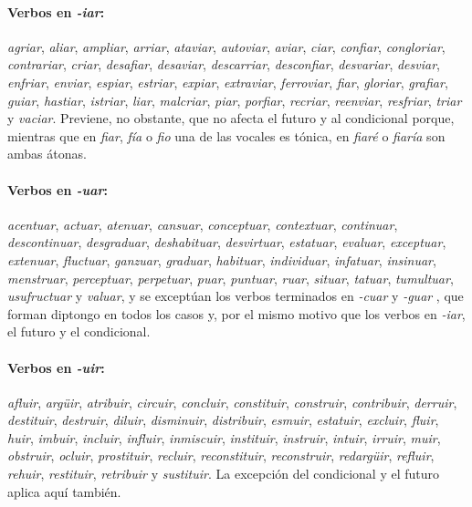 \paragraph{Verbos en \textit{-iar}:}{\textit{agriar}, \textit{aliar}, \textit{ampliar}, \textit{arriar}, \textit{ataviar}, \textit{autoviar}, \textit{aviar}, \textit{ciar}, \textit{confiar}, \textit{congloriar}, \textit{contrariar}, \textit{criar}, \textit{desafiar}, \textit{desaviar}, \textit{descarriar}, \textit{desconfiar}, \textit{desvariar}, \textit{desviar}, \textit{enfriar}, \textit{enviar}, \textit{espiar}, \textit{estriar}, \textit{expiar},  \textit{extraviar}, \textit{ferroviar}, \textit{fiar}, \textit{gloriar}, \textit{grafiar}, \textit{guiar}, \textit{hastiar}, \textit{istriar}, \textit{liar}, \textit{malcriar}, \textit{piar}, \textit{porfiar}, \textit{recriar}, \textit{reenviar}, \textit{resfriar}, \textit{triar} y \textit{vaciar}. Previene, no obstante, que no afecta el futuro y al condicional porque, mientras que en \textit{fiar}, \textit{fía} o \textit{fio} una de las vocales es tónica, en \textit{fiaré} o \textit{fiaría} son ambas átonas.}

\paragraph{Verbos en \textit{-uar}:}{\textit{acentuar}, \textit{actuar}, \textit{atenuar}, \textit{cansuar}, \textit{conceptuar}, \textit{contextuar}, \textit{continuar}, \textit{descontinuar}, \textit{desgraduar}, \textit{deshabituar}, \textit{desvirtuar}, \textit{estatuar}, \textit{evaluar}, \textit{exceptuar}, \textit{extenuar}, \textit{fluctuar}, \textit{ganzuar}, \textit{graduar}, \textit{habituar}, \textit{individuar}, \textit{infatuar}, \textit{insinuar}, \textit{menstruar}, \textit{perceptuar}, \textit{perpetuar}, \textit{puar}, \textit{puntuar}, \textit{ruar}, \textit{situar}, \textit{tatuar}, \textit{tumultuar},  \textit{usufructuar} y \textit{valuar}, y se exceptúan los verbos terminados en \textit{-cuar} \textipa{[kwaR]} y \textit{-guar} \textipa{[gwaR]}, que forman diptongo en todos los casos y, por el mismo motivo que los verbos en \textit{-iar}, el futuro y el condicional.}
	
\paragraph{Verbos en \textit{-uir}:}{\textit{afluir}, \textit{argüir}, \textit{atribuir}, \textit{circuir}, \textit{concluir}, \textit{constituir}, \textit{construir}, \textit{contribuir}, \textit{derruir}, \textit{destituir}, \textit{destruir}, \textit{diluir}, \textit{disminuir}, \textit{distribuir}, \textit{esmuir}, \textit{estatuir}, \textit{excluir}, \textit{fluir}, \textit{huir}, \textit{imbuir}, \textit{incluir}, \textit{influir}, \textit{inmiscuir}, \textit{instituir}, \textit{instruir}, \textit{intuir}, \textit{irruir}, \textit{muir}, \textit{obstruir}, \textit{ocluir}, \textit{prostituir}, \textit{recluir}, \textit{reconstituir}, \textit{reconstruir}, \textit{redargüir}, \textit{refluir}, \textit{rehuir}, \textit{restituir}, \textit{retribuir} y \textit{sustituir}. La excepción del condicional y el futuro aplica aquí también.}

